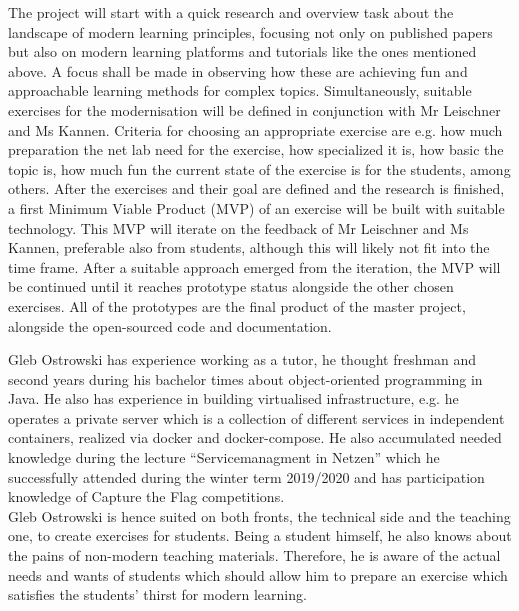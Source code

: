 The project will start with a quick research and overview task about the landscape of modern learning principles, focusing not only on published papers but also on modern learning platforms and tutorials like the ones mentioned above.
A focus shall be made in observing how these are achieving fun and approachable learning methods for complex topics.
Simultaneously, suitable exercises for the modernisation will be defined in conjunction with Mr Leischner and Ms Kannen.
Criteria for choosing an appropriate exercise are e.g. how much preparation the net lab need for the exercise, how specialized it is, how basic the topic is, how much fun the current state of the exercise is for the students, among others.
After the exercises and their goal are defined and the research is finished, a first Minimum Viable Product (MVP) of an exercise will be built with suitable technology.
This MVP will iterate on the feedback of Mr Leischner and Ms Kannen, preferable also from students, although this will likely not fit into the time frame.
After a suitable approach emerged from the iteration, the MVP will be continued until it reaches prototype status alongside the other chosen exercises.
All of the prototypes are the final product of the master project, alongside the open-sourced code and documentation.

Gleb Ostrowski has experience working as a tutor, he thought freshman and second years during his bachelor times about object-oriented programming in Java.
He also has experience in building virtualised infrastructure, e.g. he operates a private server which is a collection of different services in independent containers, realized via docker and docker-compose.
He also accumulated needed knowledge during the lecture \enquote{Servicemanagment in Netzen} which he successfully attended during the winter term 2019/2020 and has participation knowledge of Capture the Flag competitions. \\
Gleb Ostrowski is hence suited on both fronts, the technical side and the teaching one, to create exercises for students.
Being a student himself, he also knows about the pains of non-modern teaching materials.
Therefore, he is aware of the actual needs and wants of students which should allow him to prepare an exercise which satisfies the students' thirst for modern learning.
